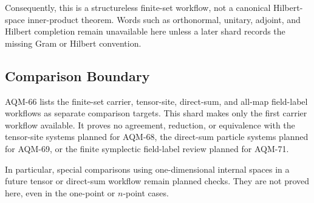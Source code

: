 Consequently, this is a structureless finite-set workflow, not a canonical
Hilbert-space inner-product theorem.  Words such as orthonormal, unitary,
adjoint, and Hilbert completion remain unavailable here unless a later shard
records the missing Gram or Hilbert convention.

\subsection{Comparison Boundary}

AQM-66 lists the finite-set carrier, tensor-site, direct-sum, and all-map
field-label workflows as separate comparison targets.  This shard makes only
the first carrier workflow available.  It proves no agreement, reduction, or
equivalence with the tensor-site systems planned for AQM-68, the direct-sum
particle systems planned for AQM-69, or the finite symplectic field-label
review planned for AQM-71.

In particular, special comparisons using one-dimensional internal spaces in a
future tensor or direct-sum workflow remain planned checks.  They are not
proved here, even in the one-point or \(n\)-point cases.
